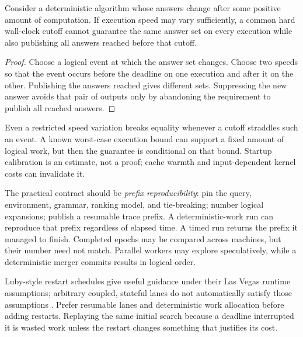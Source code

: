 
\begin{proposition}\label{prop:clock}
Consider a deterministic algorithm whose answers change after some positive
amount of computation. If execution speed may vary sufficiently, a common hard
wall-clock cutoff cannot guarantee the same answer set on every execution
while also publishing all answers reached before that cutoff.
\end{proposition}
\begin{proof}
Choose a logical event at which the answer set changes. Choose two speeds so
that the event occurs before the deadline on one execution and after it on the
other. Publishing the answers reached gives different sets. Suppressing the
new answer avoids that pair of outputs only by abandoning the requirement to
publish all reached answers.
\end{proof}

Even a restricted speed variation breaks equality whenever a cutoff straddles
such an event. A known worst-case execution bound can support a fixed amount
of logical work, but then the guarantee is conditional on that bound. Startup
calibration is an estimate, not a proof; cache warmth and input-dependent
kernel costs can invalidate it.

The practical contract should be \emph{prefix reproducibility}: pin the
query, environment, grammar, ranking model, and tie-breaking; number logical
expansions; publish a resumable trace prefix. A deterministic-work run can
reproduce that prefix regardless of elapsed time. A timed run returns the
prefix it managed to finish. Completed epochs may be compared across machines,
but their number need not match. Parallel workers may explore speculatively,
while a deterministic merger commits results in logical order.

Luby-style restart schedules give useful guidance under their Las Vegas
runtime assumptions; arbitrary coupled, stateful lanes do not automatically
satisfy those assumptions \cite{luby}. Prefer resumable lanes and deterministic
work allocation before adding restarts. Replaying the same initial search
because a deadline interrupted it is wasted work unless the restart changes
something that justifies its cost.
